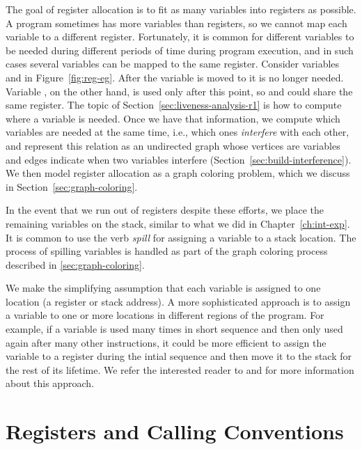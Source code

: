 \documentclass[11pt]{book}
\begin{document}
The goal of register allocation is to fit as many variables into
registers as possible. A program sometimes has more variables than
registers, so we cannot map each variable to a different
register. Fortunately, it is common for different variables to be
needed during different periods of time during program execution, and
in such cases several variables can be mapped to the same register.
Consider variables  and  in Figure~\ref{fig:reg-eg}.
After the variable  is moved to  it is no longer
needed.  Variable , on the other hand, is used only after this
point, so  and  could share the same register. The
topic of Section~\ref{sec:liveness-analysis-r1} is how to compute
where a variable is needed.  Once we have that information, we compute
which variables are needed at the same time, i.e., which ones
\emph{interfere} with each other, and represent this relation as an
undirected graph whose vertices are variables and edges indicate when
two variables interfere (Section~\ref{sec:build-interference}). We
then model register allocation as a graph coloring problem, which we
discuss in Section~\ref{sec:graph-coloring}.

In the event that we run out of registers despite these efforts, we
place the remaining variables on the stack, similar to what we did in
Chapter~\ref{ch:int-exp}. It is common to use the verb \emph{spill}
for assigning a variable to a stack location. The process of spilling
variables is handled as part of the graph coloring process described
in \ref{sec:graph-coloring}.

We make the simplifying assumption that each variable is assigned to
one location (a register or stack address). A more sophisticated
approach is to assign a variable to one or more locations in different
regions of the program.  For example, if a variable is used many times
in short sequence and then only used again after many other
instructions, it could be more efficient to assign the variable to a
register during the intial sequence and then move it to the stack for
the rest of its lifetime. We refer the interested reader to
\citet{Cooper:1998ly} and \citet{Cooper:2011aa} for more information
about this approach.


\section{Registers and Calling Conventions}
\label{sec:calling-conventions}
\end{document}
